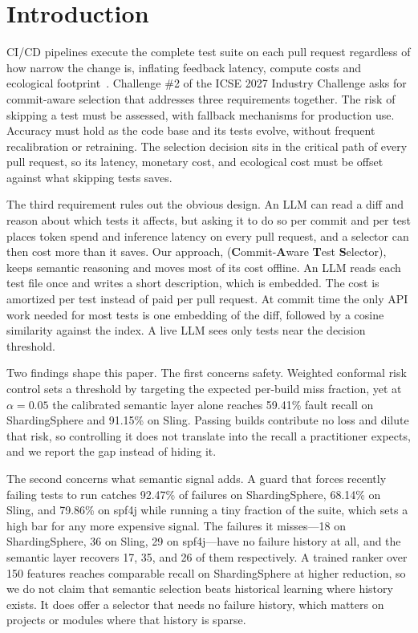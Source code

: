 \section{Introduction}
\label{sec:intro}

CI/CD pipelines execute the complete test suite on each pull request regardless of how narrow the change is, inflating feedback latency, compute costs and ecological footprint~\cite{challenge}. Challenge \#2 of the ICSE 2027 Industry Challenge asks for commit-aware selection that addresses three requirements together. The risk of skipping a test must be assessed, with fallback mechanisms for production use. Accuracy must hold as the code base and its tests evolve, without frequent recalibration or retraining. The selection decision sits in the critical path of every pull request, so its latency, monetary cost, and ecological cost must be offset against what skipping tests saves.

The third requirement rules out the obvious design. An LLM can read a diff and reason about which tests it affects, but asking it to do so per commit and per test places token spend and inference latency on every pull request, and a selector can then cost more than it saves. Our approach, \tool{} (\textbf{C}ommit-\textbf{A}ware \textbf{T}est \textbf{S}elector), keeps semantic reasoning and moves most of its cost offline. An LLM reads each test file once and writes a short description, which is embedded. The cost is amortized per test instead of paid per pull request. At commit time the only API work needed for most tests is one embedding of the diff, followed by a cosine similarity against the index. A live LLM sees only tests near the decision threshold.

Two findings shape this paper. The first concerns safety. Weighted conformal risk control sets a threshold by targeting the expected per-build miss fraction, yet at $\alpha = 0.05$ the calibrated semantic layer alone reaches 59.41\% fault recall on ShardingSphere and 91.15\% on Sling. Passing builds contribute no loss and dilute that risk, so controlling it does not translate into the recall a practitioner expects, and we report the gap instead of hiding it.

The second concerns what semantic signal adds. A guard that forces recently failing tests to run catches 92.47\% of failures on ShardingSphere, 68.14\% on Sling, and 79.86\% on spf4j while running a tiny fraction of the suite, which sets a high bar for any more expensive signal. The failures it misses---18 on ShardingSphere, 36 on Sling, 29 on spf4j---have no failure history at all, and the semantic layer recovers 17, 35, and 26 of them respectively. A trained ranker over 150 features reaches comparable recall on ShardingSphere at higher reduction, so we do not claim that semantic selection beats historical learning where history exists. It does offer a selector that needs no failure history, which matters on projects or modules where that history is sparse.

